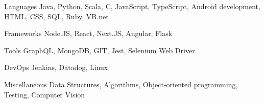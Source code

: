 


\begin{cvskills}

  \cvskill
    {Languages} %
    {Java, Python, Scala, C, JavaScript, TypeScript, Android development, HTML, CSS, SQL, Ruby, VB.net} %

  \cvskill
    {Frameworks} %
    {Node.JS, React, Next.JS, Angular, Flask} %

  \cvskill
    {Tools} %
    {GraphQL, MongoDB, GIT, Jest, Selenium Web Driver} %

  \cvskill
    {DevOps} %
    {Jenkins, Datadog, Linux} %

  \cvskill
    {Miscellaneous} %
    {Data Structures, Algorithms, Object-oriented programming, Testing, Computer Vision} %

\end{cvskills}

